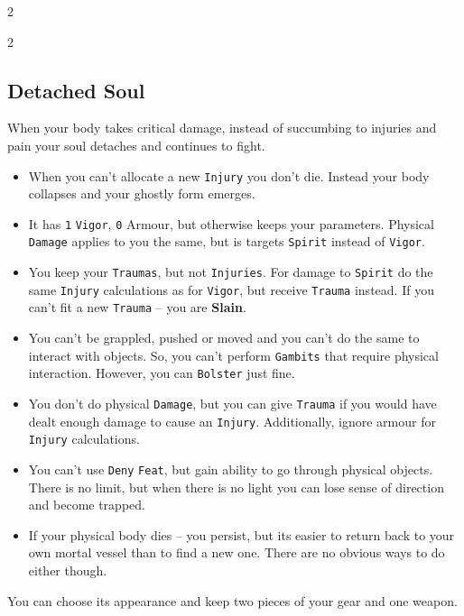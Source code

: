 \documentclass{osr-template/zine}
\begin{document}
\begin{multicols*}{2}
\begin{itemize}[nosep]
\end{itemize}

\end{multicols*}


\newpage

\begin{multicols*}{2}

    \subsection*{Detached Soul}

    When your body takes critical damage, instead of succumbing to injuries and pain your soul detaches and continues to fight.

    \begin{itemize}[nosep]
        \item When you can't allocate a new \texttt{Injury} you don't die. Instead your body collapses and your ghostly form emerges.
        \item It has \texttt{1} \texttt{Vigor}, \texttt{0} Armour, but otherwise keeps your parameters.
              Physical \texttt{Damage} applies to you the same, but is targets \texttt{Spirit} instead of \texttt{Vigor}.
        \item You keep your \texttt{Traumas}, but not \texttt{Injuries}. For damage to \texttt{Spirit} do the same \texttt{Injury} calculations as for \texttt{Vigor}, but receive \texttt{Trauma} instead. If you can't fit a new \texttt{Trauma} -- you are \textbf{Slain}.
        \item You can't be grappled, pushed or moved and you can't do the same to interact with objects. So, you can't perform \texttt{Gambits} that require physical interaction. However, you can \texttt{Bolster} just fine.
        \item You don't do physical \texttt{Damage}, but you can give \texttt{Trauma} if you would have dealt enough damage to cause an \texttt{Injury}. Additionally, ignore armour for \texttt{Injury} calculations.
        \item You can't use \texttt{Deny} \texttt{Feat}, but gain ability to go through physical objects.
              There is no limit, but when there is no light you can lose sense of direction and become trapped.
        \item If your physical body dies -- you persist, but its easier to return back to your own mortal vessel than to find a new one. There are no obvious ways to do either though.
    \end{itemize}
You can choose its appearance and keep two pieces of your gear and one weapon.


\end{multicols*}
\end{document}
